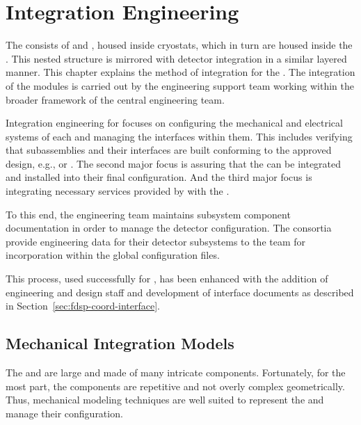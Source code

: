 \chapter{Integration Engineering}
\label{sec:fdsp-coord-integ-sysengr}

The   consists of  and
, housed inside cryostats, which in turn are housed
inside the  .  This nested structure is
mirrored with detector integration in a similar layered manner.  This
chapter explains the method of integration for the .
The integration of the modules is carried out by the
 engineering support team working within the broader framework of the  central engineering team.



Integration engineering for  focuses on configuring the
mechanical and electrical systems of each  and managing
the interfaces within them. This includes verifying that subassemblies
and their interfaces are built conforming to the approved design,
e.g.,  or . The second major focus
is assuring that the  can be integrated and
installed into their final configuration. And the third major focus is
integrating necessary services provided by  
with the .


To this end, the  engineering team maintains
subsystem component documentation in order to manage the detector
configuration.
The consortia provide engineering data for their detector subsystems to the  team for incorporation within the global configuration files.


This process, used successfully for , %
has been enhanced with the addition of engineering
and design staff and development of interface documents as described
in Section~\ref{sec:fdsp-coord-interface}.

\section{Mechanical Integration Models}
\label{sec:fdsp-coord-integ-models}

The  and   are large and made of many
intricate components. Fortunately, for the most part, the
components are repetitive and not overly complex
geometrically. Thus, \threed mechanical modeling techniques are well suited
to represent the  and manage their configuration.

